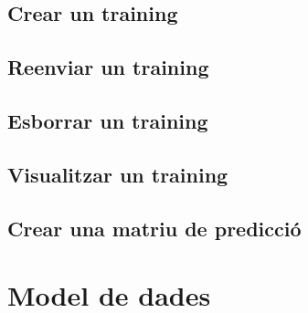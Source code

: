 \subsection{Crear un training}
\subsection{Reenviar un training}
\subsection{Esborrar un training}
\subsection{Visualitzar un training}
\subsection{Crear una matriu de predicci\'{o}}


\section{Model de dades}